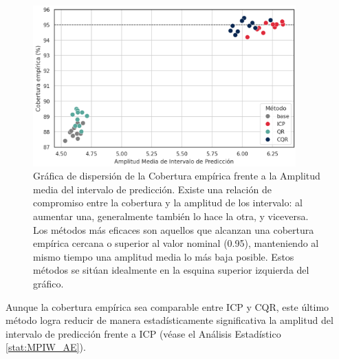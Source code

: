 \begin{figure}[h]
    \centering
    \includegraphics[width=0.9\textwidth]{capitulos/cap_05/imagenes/AE_scatterplot_EC-MPIW.png}
    \caption[
        Problema de estimación de edad:
        Gráfica de dispersión de la cobertura empírica frente a la amplitud media del intervalo de predicción.
    ]{
        Gráfica de dispersión de la Cobertura empírica frente a la Amplitud media del intervalo de predicción.
        Existe una relación de compromiso entre la cobertura y la amplitud de los intervalo: al aumentar una, generalmente también lo hace la otra, y viceversa. Los métodos más eficaces son aquellos que alcanzan una cobertura empírica cercana o superior al valor nominal (0.95), manteniendo al mismo tiempo una amplitud media lo más baja posible. Estos métodos se sitúan idealmente en la esquina superior izquierda del gráfico.
    }
    \label{fig:AE_scatterplot_EC-MPIW}
\end{figure}

\FloatBarrier

Aunque la cobertura empírica sea comparable entre ICP y CQR, este último método logra reducir de manera estadísticamente significativa la amplitud del intervalo de predicción frente a ICP (véase el Análisis Estadístico \ref{stat:MPIW_AE}). 

